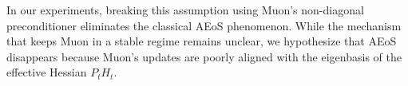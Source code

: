 \documentclass{article}
\newcommand{\TODO}[1]{{\color{red}#1}}
\theoremstyle{plain}
\theoremstyle{definition}
\theoremstyle{remark}
\begin{document}
In our experiments, breaking this assumption using Muon’s non-diagonal preconditioner eliminates the classical AEoS phenomenon. While the mechanism that keeps Muon in a stable regime remains unclear, we hypothesize that AEoS disappears because Muon’s updates are poorly aligned with the eigenbasis of the effective Hessian $P_tH_t$.


\end{document}
